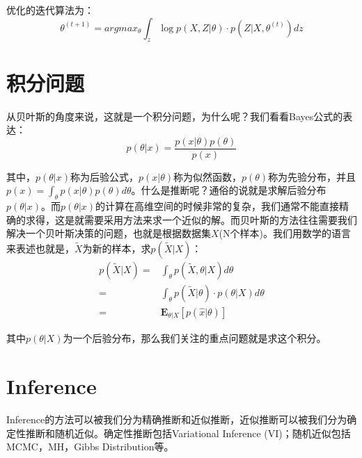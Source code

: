 \documentclass[a4paper]{article}
\begin{document}
优化的迭代算法为：
\begin{equation}
    \theta^{(t+1)} = argmax_{\theta}\int_{z} \log p(X,Z|\theta)\cdot p(Z|X,\theta^{(t)}) dz
\end{equation}

\section{积分问题}
从贝叶斯的角度来说，这就是一个积分问题，为什么呢？我们看看Bayes公式的表达：
\begin{equation}
    p(\theta|x) = \frac{p(x|\theta)p(\theta)}{p(x)} 
\end{equation}

其中，$p(\theta|x)$称为后验公式，$p(x|\theta)$称为似然函数，$p(\theta)$称为先验分布，并且$p(x) = \int_{\theta}p(x|\theta)p(\theta)d\theta$。什么是推断呢？通俗的说就是求解后验分布$p(\theta|x)$。而$p(\theta|x)$的计算在高维空间的时候非常的复杂，我们通常不能直接精确的求得，这是就需要采用方法来求一个近似的解。而贝叶斯的方法往往需要我们解决一个贝叶斯决策的问题，也就是根据数据集$X$(N个样本)。我们用数学的语言来表述也就是，$\widetilde{X}$为新的样本，求$p(\widetilde{X}|X)$：
\begin{equation}
    \begin{split}
        p(\widetilde{X}|X) 
        = & \int_{\theta} p(\widetilde{X},\theta|X) d\theta \\
        = & \int_{\theta} p(\widetilde{X}|\theta)\cdot p(\theta|X)d\theta \\
        = & \mathbf{E}_{\theta|X} [p(\hat{x}|\theta)]
    \end{split}
\end{equation}

其中$p(\theta|X)$为一个后验分布，那么我们关注的重点问题就是求这个积分。
\section{Inference}
Inference的方法可以被我们分为精确推断和近似推断，近似推断可以被我们分为确定性推断和随机近似。确定性推断包括Variational Inference (VI)；随机近似包括MCMC，MH，Gibbs Distribution等。
\end{document}
